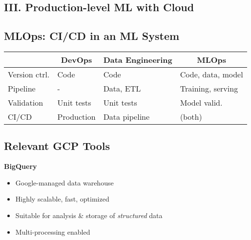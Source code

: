 \documentclass[10pt,landscape,letterpaper]{cheatsheet}
\begin{document}
\begin{multicols}{3}
\section{III. Production-level ML with Cloud}

\subsection{MLOps: CI/CD in an ML System}

\begin{tabular}{@{}llll@{}}
\toprule
                  & \multicolumn{1}{c}{\textbf{DevOps}} & \multicolumn{1}{c}{\textbf{Data Engineering}} & \multicolumn{1}{c}{\textbf{MLOps}} \\ \midrule
Version ctrl.   & Code                                & Code                                          & Code, data, model                  \\
Pipeline          & -                                   & Data, ETL                                     & Training, serving                  \\
Validation        & Unit tests                          & Unit tests                                    & Model valid.                   \\
CI/CD & Production                          & Data pipeline                                 & (both)                             \\ \bottomrule
\end{tabular}

\subsection{Relevant GCP Tools}

\textbf{BigQuery}

\begin{itemize}
    \item Google-managed data warehouse
    \item Highly scalable, fast, optimized
    \item Suitable for analysis \& storage of \textit{structured} data
    \item Multi-processing enabled
\end{itemize}


\end{multicols}
\end{document}
